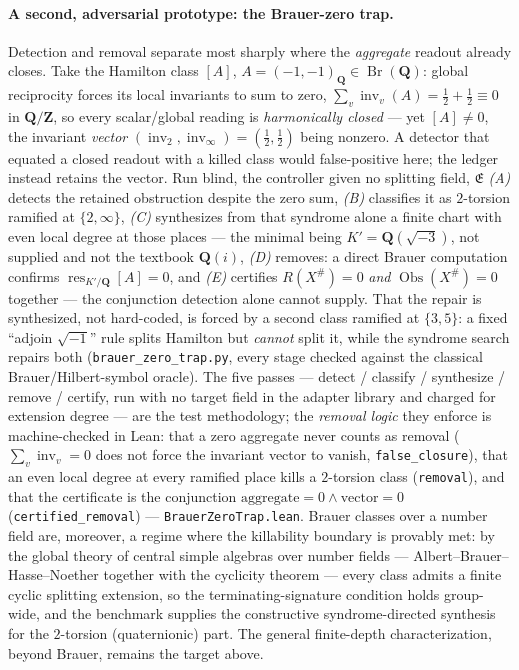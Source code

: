 \documentclass[11pt]{article}
\theoremstyle{definition}
\begin{document}
\paragraph{A second, adversarial prototype: the Brauer-zero trap.} Detection and removal separate most
sharply where the \emph{aggregate} readout already closes. Take the Hamilton class $[A]$,
$A=(-1,-1)_{\mathbf Q}\in\operatorname{Br}(\mathbf Q)$: global reciprocity forces its local invariants to sum to
zero, $\sum_v\operatorname{inv}_v(A)=\tfrac12+\tfrac12\equiv0$ in $\mathbf Q/\mathbf Z$, so every scalar/global
reading is \emph{harmonically closed} --- yet $[A]\neq0$, the invariant \emph{vector}
$(\operatorname{inv}_2,\operatorname{inv}_\infty)=(\tfrac12,\tfrac12)$ being nonzero. A detector that equated a
closed readout with a killed class would false-positive here; the ledger instead retains the vector. Run blind,
the controller given no splitting field, $\mathfrak E$ \emph{(A)} detects the retained obstruction despite the
zero sum, \emph{(B)} classifies it as $2$-torsion ramified at $\{2,\infty\}$, \emph{(C)} synthesizes from that
syndrome alone a finite chart with even local degree at those places --- the minimal being $K'=\mathbf
Q(\sqrt{-3})$, not supplied and not the textbook $\mathbf Q(i)$, \emph{(D)} removes: a direct Brauer computation
confirms $\operatorname{res}_{K'/\mathbf Q}[A]=0$, and \emph{(E)} certifies $R(X^\#)=0$ \emph{and}
$\operatorname{Obs}(X^\#)=0$ together --- the conjunction detection alone cannot supply. That the repair is
synthesized, not hard-coded, is forced by a second class ramified at $\{3,5\}$: a fixed ``adjoin $\sqrt{-1}$'' rule
splits Hamilton but \emph{cannot} split it, while the syndrome search repairs both (\texttt{brauer\_zero\_trap.py},
every stage checked against the classical Brauer/Hilbert-symbol oracle). The five passes --- detect / classify / synthesize / remove / certify, run with no target field in the adapter library and charged for extension degree --- are the test methodology; the \emph{removal logic} they enforce is machine-checked in Lean: that a zero aggregate never counts as removal ($\sum_v\operatorname{inv}_v=0$ does not force the invariant vector to vanish, \texttt{false\_closure}), that an even local degree at every ramified place kills a $2$-torsion class (\texttt{removal}), and that the certificate is the conjunction $\text{aggregate}=0\wedge\text{vector}=0$ (\texttt{certified\_removal}) --- \texttt{BrauerZeroTrap.lean}. Brauer classes over a number field are,
moreover, a regime where the killability boundary is provably met: by the global theory of central simple
algebras over number fields --- Albert--Brauer--Hasse--Noether together with the cyclicity theorem --- every
class admits a finite cyclic splitting extension, so the terminating-signature condition holds group-wide, and the benchmark
supplies the constructive syndrome-directed synthesis for the $2$-torsion (quaternionic) part. The general
finite-depth characterization, beyond Brauer, remains the target above.
\end{document}
